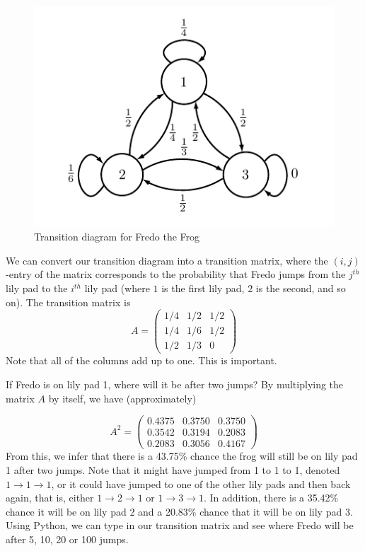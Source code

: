 \begin{figure}[h]
\includegraphics[width=\textwidth]{markov1}
\caption{Transition diagram for Fredo the Frog}
\label{fig:markov1}
\end{figure}

We can convert our transition diagram into a transition matrix, where the $(i,j)$-entry of the matrix corresponds to the probability that Fredo jumps from the $j^{th}$ lily pad to the $i^{th}$ lily pad (where $1$ is the first lily pad, $2$ is the second, and so on).
The transition matrix is
\[
A = \begin{pmatrix}
1/4 & 1/2 & 1/2\\
1/4 & 1/6 & 1/2\\
1/2 & 1/3 & 0
\end{pmatrix}
\]
Note that all of the columns add up to one.
This is important.

If Fredo is on lily pad 1, where will it be after two jumps?
By multiplying the matrix $A$ by itself, we have (approximately)

\[
A^2 = \begin{pmatrix}
0.4375 & 0.3750 & 0.3750\\
0.3542 & 0.3194 & 0.2083\\
0.2083 & 0.3056 & 0.4167
\end{pmatrix}
\]
From this, we infer that there is a 43.75\% chance the frog will still be on lily pad 1 after two jumps.
Note that it might have jumped from 1 to 1 to 1, denoted $1 \rightarrow 1 \rightarrow 1$, or it could have jumped to one of the other lily pads and then back again, that is, either $1 \rightarrow 2 \rightarrow 1$ or $1 \rightarrow 3 \rightarrow 1$.
In addition, there is a 35.42\% chance it will be on lily pad 2 and a 20.83\% chance that it will be on lily pad 3.
Using Python, we can type in our transition matrix and see where Fredo will be after 5, 10, 20 or 100 jumps.

